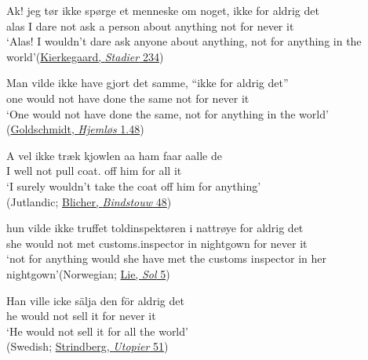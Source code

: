 \ea \label{ex:9-56}
\ea \gll Ak! jeg tør ikke spørge et menneske om noget, ikke for aldrig det\\
 alas I dare not ask a person about anything not for never it\\\normalsize
 \glt `Alas! I wouldn't dare ask anyone about anything, not for anything in the world'\hfill(\href{https://tekster.kb.dk/text/sks-slv-txt-root#ss239}{Kierkegaard, \textit{Stadier} 234})
 
 \ex  \gll Man vilde ikke have gjort det samme, ``ikke for aldrig det''\\
 one would not have done the same not for never it\\
 \glt `One would not have done the same, not for anything in the world'\\\hfill(\href{https://tekster.kb.dk/text/adl-texts-goldschmidt03-root#idm139686922076496}{Goldschmidt, \textit{Hjemløs} 1.48}) %
 
 \ex  \gll A vel ikke træk kjowlen aa ham faar aalle de\\ %
 I well not pull coat.\DEF{} off him for all it\\
 \glt `I surely wouldn't take the coat off him for anything'\\\hfill(Jutlandic; \href{https://books.google.co.jp/books?id=zggQAQAAIAAJ&printsec=frontcover&dq=inauthor:%22Steen+Steensen+Blicher%22&hl=ja&newbks=1&newbks_redir=0&sa=X&redir_esc=y#v=onepage&q=%22faar%20aalle%22&f=false}{Blicher, \textit{Bindstouw} 48})
 
 \ex  \gll hun vilde ikke truffet toldinspektøren i nattrøye for aldrig det\\
 she would not met {customs.inspector} in nightgown for never it\\
 \glt `not for anything would she have met the customs inspector in her nightgown'\hfill(Norwegian; \href{https://archive.org/details/naarsolgaarnedfo00liej/page/4/mode/2up?q=%22hun+vilde+ikke+truffet%22&view=theater}{Lie, \textit{Sol} 5})
 
 \ex  \gll Han ville icke sälja den för aldrig det\\
 he would not sell it for never it\\
 \glt `He would not sell it for all the world'\\\hfill(Swedish; \href{https://litteraturbanken.se/f%C3%B6rfattare/StrindbergA/titlar/UtopierIVerkligheten1885/sida/51/faksimil}{Strindberg, \textit{Utopier} 51}) %
\z
\z
{}


